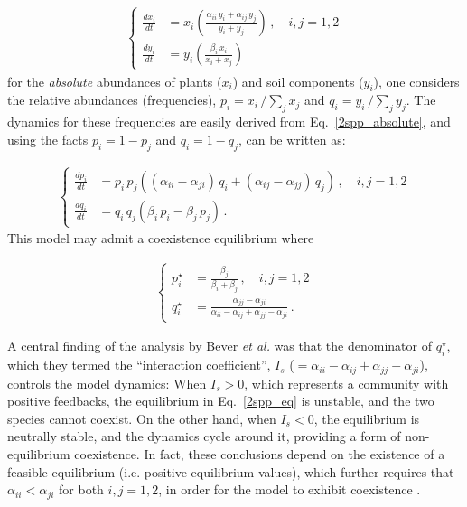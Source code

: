 \documentclass[11pt]{article}
\begin{document}
\begin{align} \label{2spp_absolute}
	\begin{cases}
	\frac{dx_i}{dt} &= x_i \left( \frac{\alpha_{ii} \, y_i + \alpha_{ij} \, y_j}{y_i + y_j} \right) \, , \quad  i, j = 1,2 \\
	\frac{dy_i}{dt} &= y_i \left( \frac{\beta_i \, x_i}{x_i + x_j} \right)
	\end{cases}
\end{align}
for the \emph{absolute} abundances of plants ($x_i$) and soil components ($y_i$), one considers the relative abundances (frequencies), $p_i = x_i \, / \sum_j x_j$ and $q_i = y_i \, / \sum_{j} y_j$. The dynamics for these frequencies are easily derived from Eq.~\ref{2spp_absolute}, and using the facts $p_i = 1 - p_j$ and $q_i = 1 - q_j$, can be written as:

\begin{align} \label{2spp_relative}
\begin{cases}
\frac{dp_i}{dt} &= p_i \, p_j \left( (\alpha_{ii} - \alpha_{ji}) \, q_i + (\alpha_{ij} - \alpha_{jj}) \, q_j \right) \, , \quad  i, j = 1,2 \\
\frac{dq_i}{dt} &= q_i \, q_j (\beta_i \, p_i - \beta_j \, p_j) \, .
\end{cases}
\end{align}
This model may admit a coexistence equilibrium where

\begin{align} \label{2spp_eq}
\begin{cases}
p_i^\star &= \frac{\beta_j}{\beta_i + \beta_j} \, , \quad  i, j = 1,2 \\
q_i^\star &= \frac{\alpha_{jj} - \alpha_{ji}}{\alpha_{ii} - \alpha_{ij} + \alpha_{jj} - \alpha_{ji}} \, .
\end{cases}
\end{align}

A central finding of the analysis by Bever \textit{et al.} was that the denominator of $q_i^\star$, which they termed the ``interaction coefficient'', $I_s$ ($= \alpha_{ii} - \alpha_{ij} + \alpha_{jj} - \alpha_{ji}$), controls the model dynamics: When $I_s > 0$, which represents a community with positive feedbacks, the equilibrium in Eq.~\ref{2spp_eq} is unstable, and the two species cannot coexist. On the other hand, when $I_s < 0$, the equilibrium is neutrally stable, and the dynamics cycle around it, providing a form of non-equilibrium coexistence. In fact, these conclusions depend on the existence of a feasible equilibrium (i.e. positive equilibrium values), which further requires that $\alpha_{ii} < \alpha_{ji}$ for both $i, j = 1, 2$, in order for the model to exhibit coexistence \citep{bever1997incorporating,ke2015incorporating}. 
\end{document}
